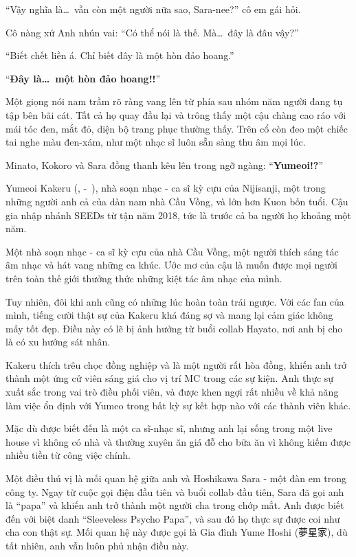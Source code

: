 \documentclass[../main.tex]{subfiles}
\begin{document}
``Vậy nghĩa là\dots\ vẫn còn một người nữa sao, Sara-nee?'' cô em gái hỏi.

Cô nàng xứ Anh nhún vai: ``Có thể nói là thế. Mà\dots\ đây là đâu vậy?''

``Biết chết liền á. Chỉ biết đây là một hòn đảo hoang.''

``\textbf{Đây là\dots\ một hòn đảo hoang!!}''


Một giọng nói nam trầm rõ ràng vang lên từ phía sau nhóm năm người đang tụ tập bên bãi cát. Tất cả họ quay đầu lại và trông thấy một cậu chàng cao ráo với mái tóc đen, mắt đỏ, diện bộ trang phục thường thấy. Trên cổ còn đeo một chiếc tai nghe màu đen-xám, như một nhạc sĩ luôn sẵn sàng thu âm mọi lúc.

Minato, Kokoro và Sara đồng thanh kêu lên trong ngỡ ngàng: ``\textbf{Yumeoi!?}''

\chrint

Yumeoi Kakeru (, -\ ), nhà soạn nhạc - ca sĩ kỳ cựu của Nijisanji, một trong những người anh cả của dàn nam nhà Cầu Vồng, và lớn hơn Kuon bốn tuổi. Cậu gia nhập nhánh SEEDs từ tận năm 2018, tức là trước cả ba người họ khoảng một năm.

Một nhà soạn nhạc - ca sĩ kỳ cựu của nhà Cầu Vồng, một người thích sáng tác âm nhạc và hát vang những ca khúc. Ước mơ của cậu là muốn được mọi người trên toàn thế giới thưởng thức những kiệt tác âm nhạc của mình.

Tuy nhiên, đôi khi anh cũng có những lúc hoàn toàn trái ngược. Với các fan của mình, tiếng cười thật sự của Kakeru khá đáng sợ và mang lại cảm giác không mấy tốt đẹp. Điều này có lẽ bị ảnh hưởng từ buổi collab Hayato, nơi anh bị cho là có xu hướng sát nhân.

Kakeru thích trêu chọc đồng nghiệp và là một người rất hòa đồng, khiến anh trở thành một ứng cử viên sáng giá cho vị trí MC trong các sự kiện. Anh thực sự xuất sắc trong vai trò điều phối viên, và được khen ngợi rất nhiều về khả năng làm việc ổn định với Yumeo trong bất kỳ sự kết hợp nào với các thành viên khác.

Mặc dù được biết đến là một ca sĩ-nhạc sĩ, nhưng anh lại sống trong một live house vì không có nhà và thường xuyên ăn giá đỗ cho bữa ăn vì không kiếm được nhiều tiền từ công việc chính.

Một điều thú vị là mối quan hệ giữa anh và Hoshikawa Sara - một đàn em trong công ty. Ngay từ cuộc gọi điện đầu tiên và buổi collab đầu tiên, Sara đã gọi anh là ``papa'' và khiến anh trở thành một người cha trong chớp mắt. Anh được biết đến với biệt danh ``Sleeveless Psycho Papa'', và sau đó họ thực sự được coi như cha con thật sự. Mối quan hệ này được gọi là Gia đình Yume Hoshi (夢星家), dù tất nhiên, anh vẫn luôn phủ nhận điều này.
\end{document}
